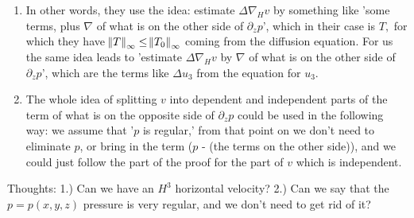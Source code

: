 \documentclass[11pt]{article}
\begin{document}
\begin{enumerate}
The terms

$$\frac{d}{dt} \norm{\nabla_H(\eta, \theta)}_2^2, \frac{d}{dt} \bigg ( \frac{\norm{\nabla T}_2^2}{2} + \frac{\norm{\nabla T}_q^q}{2}\bigg)$$

define $\frac{d}{dt} A_3.$

In order for the inequalities to work, in the first inequality we have $l_3 \times A_3,$ which is all right as there we have

$$ C(\norm{v}_\infty^2 + ... + 1) \times \norm{\nabla_H (\eta, \theta, T)}_2^2.$$

When the other side of the equation $\partial_z p = ...$ changes, then the term $ C(\norm{v}_\infty^2 + ... + 1) \times \norm{\nabla_H (\eta, \theta, \textcolor{orange}{\text{new}})}_2^2$ changes, but $A_3$ doesn't.

\item In other words, they use the idea: estimate $\Delta \nabla_H v$ by something like 'some terms, plus $\nabla$ of what is on the other side of $\partial_z p$', which in their case is $T,$ for which they have $\norm{T}_\infty \leq \norm{T_0}_\infty$ coming from the diffusion equation. For us the same idea leads to 'estimate $\Delta \nabla_H v$ by $\nabla$ of what is on the other side of $\partial_z p$', which are the terms like $\Delta u_3$ from the equation for $u_3.$

\item The whole idea of splitting $v$ into dependent and independent parts of the term of what is on the opposite side of $\partial_z p$ could be used in the following way: we assume that '$p$ is regular,' from that point on we don't need to eliminate $p$, or bring in the term ($p$ - (the terms on the other side)), and we could just follow the part of the proof for the part of $v$ which is independent.

\end{enumerate}

\textcolor{ao}{Thoughts:} \textcolor{ao}{1.) Can we have an $H^3$ horizontal velocity?} \textcolor{ao}{2.) Can we say that the $p = p(x,y,z)$ pressure is very regular, and we don't need to get rid of it?}
\end{document}
